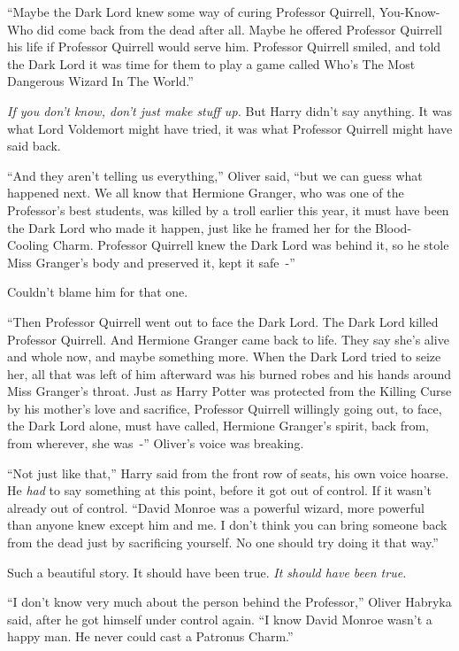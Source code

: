 ``Maybe the Dark Lord knew some way of curing Professor Quirrell, You-Know-Who did come back from the dead after all. Maybe he offered Professor Quirrell his life if Professor Quirrell would serve him. Professor Quirrell smiled, and told the Dark Lord it was time for them to play a game called Who's The Most Dangerous Wizard In The World.''

\emph{If you don't know, don't just make stuff up.} But Harry didn't say anything. It was what Lord Voldemort might have tried, it was what Professor Quirrell might have said back.

``And they aren't telling us everything,'' Oliver said, ``but we can guess what happened next. We all know that Hermione Granger, who was one of the Professor's best students, was killed by a troll earlier this year, it must have been the Dark Lord who made it happen, just like he framed her for the Blood-Cooling Charm. Professor Quirrell knew the Dark Lord was behind it, so he stole Miss Granger's body and preserved it, kept it safe~-''

Couldn't blame him for that one.

``Then Professor Quirrell went out to face the Dark Lord. The Dark Lord killed Professor Quirrell. And Hermione Granger came back to life. They say she's alive and whole now, and maybe something more. When the Dark Lord tried to seize her, all that was left of him afterward was his burned robes and his hands around Miss Granger's throat. Just as Harry Potter was protected from the Killing Curse by his mother's love and sacrifice, Professor Quirrell willingly going out, to face, the Dark Lord alone, must have called, Hermione Granger's spirit, back from, from wherever, she was~-'' Oliver's voice was breaking.

``Not just like that,'' Harry said from the front row of seats, his own voice hoarse. He \emph{had} to say something at this point, before it got out of control. If it wasn't already out of control. ``David Monroe was a powerful wizard, more powerful than anyone knew except him and me. I don't think you can bring someone back from the dead just by sacrificing yourself. No one should try doing it that way.''

Such a beautiful story. It should have been true. \emph{It should have been true.}

``I don't know very much about the person behind the Professor,'' Oliver Habryka said, after he got himself under control again. ``I know David Monroe wasn't a happy man. He never could cast a Patronus Charm.''

